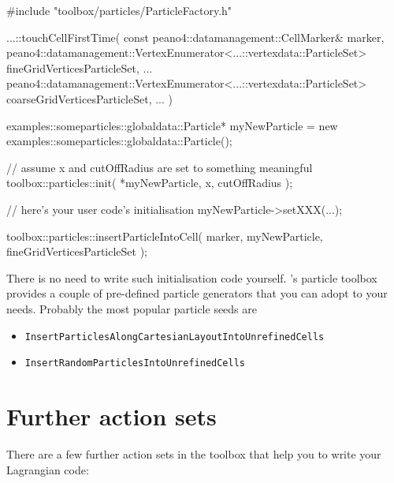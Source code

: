 \begin{code}
#include "toolbox/particles/ParticleFactory.h"



...::touchCellFirstTime(
  const peano4::datamanagement::CellMarker& marker,
  peano4::datamanagement::VertexEnumerator<...::vertexdata::ParticleSet> fineGridVerticesParticleSet, 
  ...
  peano4::datamanagement::VertexEnumerator<...::vertexdata::ParticleSet> coarseGridVerticesParticleSet,
  ...
) {
examples::someparticles::globaldata::Particle* myNewParticle = 
  new examples::someparticles::globaldata::Particle();
  
// assume x and cutOffRadius are set to something meaningful
toolbox::particles::init( *myNewParticle, x, cutOffRadius );

// here's your user code's initialisation
myNewParticle->setXXX(...);

toolbox::particles::insertParticleIntoCell(
  marker,
  myNewParticle,
  fineGridVerticesParticleSet
);
}
\end{code}


\noindent
There is no need to write such initialisation code yourself. 
\Peano's particle toolbox provides a couple of pre-defined particle generators
that you can adopt to your needs.
Probably the most popular particle seeds are
\begin{itemize}
  \item \texttt{InsertParticlesAlongCartesianLayoutIntoUnrefinedCells}
  \item \texttt{InsertRandomParticlesIntoUnrefinedCells}
\end{itemize}












\section{Further action sets}

There are a few further action sets in the toolbox that help you to write your
Lagrangian code:


